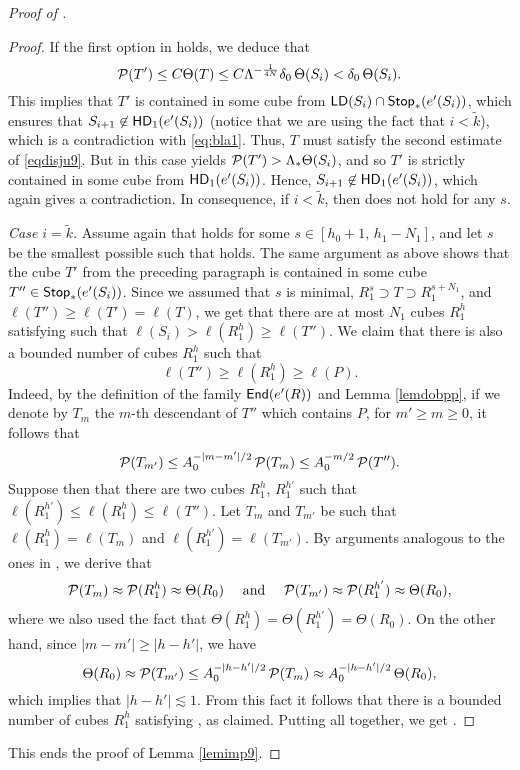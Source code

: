 \begin{proof}[Proof of ]
\begin{proof}
If the first option in  holds, we deduce that
$${\mathcal P}(T')\leq C \Theta(T)\leq C\Lambda^{-\frac1{4N}}\delta_0\,\Theta(S_i) < \delta_0\,\Theta(S_i).$$
This implies that 
  $T'$ is contained in some cube from ${\mathsf{LD}}(S_i)\cap{\mathsf {Stop}}_*(e'(S_i))$, which ensures that 
  $S_{i+1}\not\in{\mathsf{HD}}_1(e'(S_i))$ (notice that we are using the fact that $i<\tilde k$), which is a contradiction with \eqref{eq:bla1}. Thus, $T$ must satisfy the second estimate of \eqref{eqdisju9}. But in this case  yields ${\mathcal P}(T')> \Lambda_*\Theta(S_i)$, and so $T'$ is strictly contained in some cube from ${\mathsf{HD}}_1(e'(S_i))$. Hence, $S_{i+1}\not\in{\mathsf{HD}}_1(e'(S_i))$, which again gives a contradiction.
  In consequence, if $i<\tilde k$, then  does not hold for any $s$.
 \vv
 
 
\emph{Case $i=\tilde k$}. Assume again that
 holds for some $s\in [h_0+1,\, h_1-N_1]$, and let $s$ be the smallest possible such that  holds. The same argument as above shows that the cube $T'$ from the preceding paragraph is contained in some cube $T''\in{\mathsf {Stop}}_*(e'(S_i))$. Since we assumed that $s$ is minimal, $R_1^s\supset T\supset R_1^{s+N_1}$, and $\ell(T'')\ge\ell(T')=\ell(T)$, we get that there are at most $N_1$ cubes $R_1^h$ satisfying  such that 
$\ell(S_i)>\ell(R_1^h)\geq \ell(T'')$.
We claim that there is also a bounded number of cubes $R_1^h$ such that 
\begin{equation}\label{eqlastclaim5}
\ell(T'')\geq \ell(R_1^h)\geq \ell(P).
\end{equation}
Indeed, by the definition of the family ${\mathsf{End}}(e'(R))$ and Lemma
 \ref{lemdobpp}, if we denote by $T_m$ the $m$-th descendant of $T''$ which contains $P$, for $m'\geq m\geq 0$,
 it follows that 
$${\mathcal P}(T_{m'})\leq A_0^{-|m-m'|/2}\,{\mathcal P}(T_m)\leq  A_0^{-m/2}\,{\mathcal P}(T'').$$
Suppose then that there are two cubes $R_1^h$, $R_1^{h'}$ such that  $\ell(R_1^{h'})\leq \ell(R_1^h)\leq \ell(T'')$.
Let $T_m$ and $T_{m'}$ be such that $\ell(R_1^h)=\ell(T_m)$ and $\ell(R_1^{h'})= \ell(T_{m'})$.
By arguments analogous to the ones in , we derive that 
$${\mathcal P}(T_m)\approx {\mathcal P}(R_1^h) \approx \Theta(R_0)\quad \text{ and }\quad
{\mathcal P}(T_{m'})\approx {\mathcal P}(R_1^{h'}) \approx \Theta(R_0),$$
where we also used the fact that $\Theta(R_1^{h})=\Theta(R_1^{h'})=\Theta(R_0)$.
On the other hand, since $|m-m'|\geq |h-h'|$, we have
$$\Theta(R_0)\approx{\mathcal P}(T_{m'})\leq A_0^{-|h-h'|/2}\,{\mathcal P}(T_m)\approx A_0^{-|h-h'|/2}\,\Theta(R_0),$$
which implies that $|h-h'|\lesssim1$. From this fact it follows that there is a bounded number of cubes $R_1^h$ satisfying , as claimed. Putting all together, we get .
\end{proof}
This ends the proof of Lemma \ref{lemimp9}.
\end{proof}

\vv



